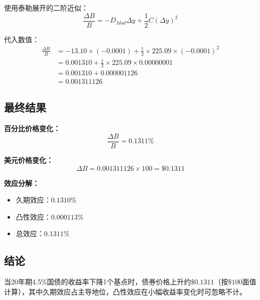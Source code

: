 使用泰勒展开的二阶近似：
\begin{equation}
\frac{\Delta B}{B} = -D_{Mod} \Delta y + \frac{1}{2}C(\Delta y)^2
\end{equation}

代入数值：
\begin{align}
\frac{\Delta B}{B} &= -13.10 \times (-0.0001) + \frac{1}{2} \times 225.09 \times (-0.0001)^2 \\
&= 0.001310 + \frac{1}{2} \times 225.09 \times 0.00000001 \\
&= 0.001310 + 0.000001126 \\
&= 0.001311126
\end{align}

\subsection{最终结果}

\textbf{百分比价格变化：}
\begin{equation}
\frac{\Delta B}{B} = 0.1311\%
\end{equation}

\textbf{美元价格变化：}
\begin{equation}
\Delta B = 0.001311126 \times 100 = \$0.1311
\end{equation}

\textbf{效应分解：}
\begin{itemize}
    \item 久期效应：$0.1310\%$
    \item 凸性效应：$0.000113\%$
    \item 总效应：$0.1311\%$
\end{itemize}

\subsection{结论}

当20年期4.5\%国债的收益率下降1个基点时，债券价格上升约$\$0.1311$（按$\$100$面值计算），其中久期效应占主导地位，凸性效应在小幅收益率变化时可忽略不计。